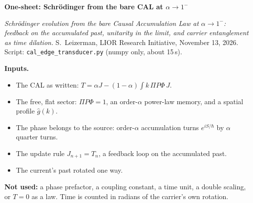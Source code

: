 \documentclass[10pt]{article}
\begin{document}
{\Large\bfseries One-sheet: Schr\"odinger from the bare CAL at $\alpha\to1^-$}\par
\textit{Schr\"odinger evolution from the bare Causal Accumulation Law at $\alpha\to1^-$: feedback on the accumulated past, unitarity in the limit, and carrier entanglement as time dilation.} S.~Leizerman, LIOR Research Initiative, November 13, 2026. Script: \texttt{cal\_edge\_transducer.py} (numpy only, about 15\,s).

\textbf{Inputs.}
\begin{itemize}\setlength{\itemsep}{0pt}
\item The CAL as written: $T=\alpha J-(1-\alpha)\int k\,\Pi P\Phi\,J$.
\item The free, flat sector: $\Pi P\Phi=1$, an order-$\alpha$ power-law memory, and a spatial profile $\hat g(k)$.
\item The phase belongs to the source: order-$\alpha$ accumulation turns $e^{iS/\hbar}$ by $\alpha$ quarter turns.
\item The update rule $J_{n+1}=T_n$, a feedback loop on the accumulated past.
\item The current's past rotated one way.
\end{itemize}
\textbf{Not used:} a phase prefactor, a coupling constant, a time unit, a double scaling, or $T=0$ as a law. Time is counted in radians of the carrier's own rotation.
\end{document}
